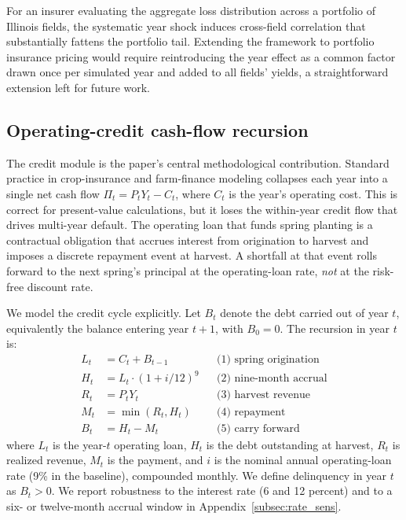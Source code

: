 \documentclass[11pt,letterpaper]{article}
\theoremstyle{remark}
\begin{document}
For an insurer evaluating the aggregate loss distribution across a portfolio of Illinois fields, the systematic year shock induces cross-field correlation that substantially fattens the portfolio tail. Extending the framework to portfolio insurance pricing would require reintroducing the year effect as a common factor drawn once per simulated year and added to all fields' yields, a straightforward extension left for future work.
 
\subsection{\label{subsec:recursion}Operating-credit cash-flow recursion}
 
The credit module is the paper's central methodological contribution. Standard practice in crop-insurance and farm-finance modeling collapses each year into a single net cash flow $\Pi_t = P_t Y_t - C_t$, where $C_t$ is the year's operating cost. This is correct for present-value calculations, but it loses the within-year credit flow that drives multi-year default. The operating loan that funds spring planting is a contractual obligation that accrues interest from origination to harvest and imposes a discrete repayment event at harvest. A shortfall at that event rolls forward to the next spring's principal at the operating-loan rate, \textit{not} at the risk-free discount rate.
 
We model the credit cycle explicitly. Let $B_t$ denote the debt carried out of year $t$, equivalently the balance entering year $t+1$, with $B_0 = 0$. The recursion in year $t$ is:
\begin{equation*}
\begin{aligned}
L_t &= C_t + B_{t-1} && \text{(1) spring origination}\\
H_t &= L_t \cdot (1 + i/12)^{9} && \text{(2) nine-month accrual}\\
R_t &= P_t Y_t && \text{(3) harvest revenue}\\
M_t &= \min(R_t, H_t) && \text{(4) repayment}\\
B_t &= H_t - M_t && \text{(5) carry forward}
\end{aligned}
\end{equation*}
where $L_t$ is the year-$t$ operating loan, $H_t$ is the debt outstanding at harvest, $R_t$ is realized revenue, $M_t$ is the payment, and $i$ is the nominal annual operating-loan rate (9\% in the baseline), compounded monthly. We define delinquency in year $t$ as $B_t > 0$. We report robustness to the interest rate (6 and 12 percent) and to a six- or twelve-month accrual window in Appendix~\ref{subsec:rate_sens}.
 
\end{document}
